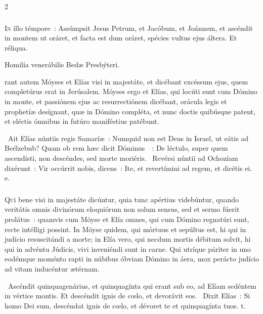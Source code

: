 \documentclass[9pt,twoside]{extarticle}
\begin{document}
\begin{multicols}{2}
{{\subsubsection*{\center {}}
\lettrine{I}n illo témpore~: Assúmpsit Jesus Petrum, et Jacóbum, et Joánnem, et ascéndit in montem ut oráret, et facta est dum oráret, spécies vultus ejus áltera. Et réliqua.

\begin{center}Homilía venerábilis Bedæ Presbýteri.\end{center}
rant autem Móyses et Elías visi in majestáte, et dicébant excéssum ejus, quem completúrus erat in Jerúsalem. Móyses ergo et Elías, qui locúti sunt cum Dómino in monte, et passiónem ejus ac resurrectiónem dicébant, orácula legis et prophetíæ desígnant, quæ in Dómino compléta, et nunc doctis quibúsque patent, et eléctis ómnibus in futúro maniféstius patébunt.

\begin{tightlist}{}
\item {}~Ait Elías núntiis regis Samaríæ~: Numquid non est Deus in Israel, ut eátis ad Beélzebub? Quam ob rem hæc dicit Dóminus~~: \textred{*} De léctulo, super quem ascendísti, non descéndes, sed morte moriéris. ~Revérsi núntii ad Ochozíam dixérunt~: Vir occúrrit nobis, dicens~: Ite, et revertímini ad regem, et dicétis ei. e.
\end{tightlist}

\subsubsection*{\center {}}
\lettrine{Q}ui bene visi in majestáte dicúntur, quia tunc apértius videbúntur, quando veritátis omnis divinórum eloquiórum non solum sensus, sed et sermo fúerit prolátus~: quamvis cum Móyse et Elía omnes, qui cum Dómino regnatúri sunt, recte intélligi possint. In Móyse quidem, qui mórtuus et sepúltus est, hi qui in judício resuscitándi a morte; in Elía vero, qui necdum mortis débitum solvit, hi qui in advéntu Júdicis, vivi inveniéndi sunt in carne. Qui utríque páriter in uno eodémque moménto rapti in núbibus óbviam Dómino in áera, mox perácto judício ad vitam inducéntur ætérnam.

\begin{tightlist}{}
\item {}~Ascéndit quinquagenárius, et quinquagínta qui erant sub eo, ad Elíam sedéntem in vértice montis. \textred{*} Et descéndit ignis de cœlo, et devorávit eos. ~Dixit Elías~: Si homo Dei sum, descéndat ignis de cœlo, et dévoret te et quinquagínta tuos. t.
\end{tightlist}

}}
\end{multicols}
\end{document}
